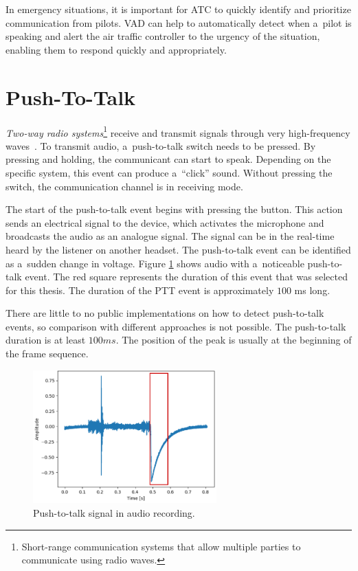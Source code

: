 In emergency situations, it is important for ATC to quickly identify and prioritize communication from pilots. VAD can help to automatically detect when a~pilot is speaking and alert the air traffic controller to the urgency of the situation, enabling them to respond quickly and appropriately.

\section{Push-To-Talk}\label{PTT}

\textit{Two-way radio systems}\footnote{Short-range communication systems that allow multiple parties to communicate using radio waves.} receive and transmit signals through very high-frequency waves~\cite{tallman_ptt_switch_2021}. To transmit audio, a~push-to-talk switch needs to be pressed. By pressing and holding, the communicant can start to speak. Depending on the specific system, this event can produce a~``click'' sound. Without pressing the switch, the communication channel is in receiving mode. 

The start of the push-to-talk event begins with pressing the button. This action sends an electrical signal to the device, which activates the microphone and broadcasts the audio as an analogue signal. The signal can be in the real-time heard by the listener on another headset. The push-to-talk event can be identified as a~sudden change in voltage. Figure \ref{fig:ptt} shows audio with a~noticeable push-to-talk event. The red square represents the duration of this event that was selected for this thesis. The duration of the PTT event is approximately $100$ ms long.

There are little to no public implementations on how to detect push-to-talk events, so comparison with different approaches is not possible. The push-to-talk duration is at least $100 ms$. The position of the peak is usually at the beginning of the frame sequence. 

    \begin{figure}[ht!]
        \centering
        \includegraphics[width = 0.63\textwidth]{obrazky-figures/ptt.png}
        \caption{Push-to-talk signal in audio recording.}
        \label{fig:ptt}
    \end{figure}

